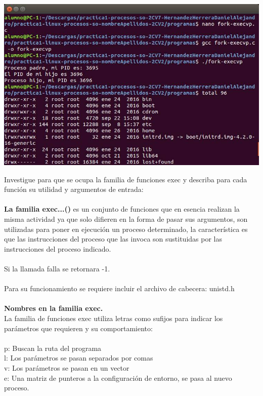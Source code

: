 \begin{center}
		\includegraphics[width=\linewidth]{imagenes/execvp.png}
	\end{center}

	Investigue para que se ocupa la familia de funciones exec y describa para cada función su utilidad y argumentos de entrada:
\\ \\
\textbf{La familia exec...()} es un conjunto de funciones que en esencia realizan la misma actividad ya que solo difieren en la forma de pasar sus argumentos, son utilizadas para poner en ejecución un proceso determinado, la característica es que las instrucciones del proceso que las invoca son sustituidas por las instrucciones del proceso indicado. 
\\ \\
Si la llamada falla se retornara -1.
\\ \\
Para su funcionamiento se requiere incluir el archivo de cabecera: unistd.h
\\ \\
	\textbf{Nombres en la familia exec.}
\\ La familia de funciones exec utiliza letras como sufijos para indicar los parámetros que requieren y su comportamiento: 
\\ \\ p: Buscan la ruta del programa 
\\ l: Los parámetros se pasan separados por comas 
\\ v: Los parámetros se pasan en un vector 
\\ e: Una matriz de punteros a la configuración de entorno, se pasa al nuevo proceso.


